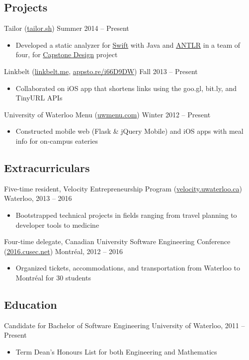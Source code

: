 \documentclass[pdftex,11pt,letterpaper]{article}
\begin{document}
\subsection*{Projects}

Tailor (\href{https://tailor.sh}{tailor.sh}) \hfill {\color{gray} Summer 2014 -- Present}
\begin{itemize}
    \item Developed a static analyzer for \href{https://developer.apple.com/swift/}{Swift} with Java and \href{http://www.antlr.org}{ANTLR} in a team of four, for \href{https://uwaterloo.ca/engineering/entrepreneurship/capstone-design/}{Capstone Design} project
\end{itemize}

Linkbelt (\href{http://linkbelt.me}{linkbelt.me}, \href{http://appsto.re/i66D9DW}{appsto.re/i66D9DW}) \hfill {\color{gray} Fall 2013 -- Present}
\begin{itemize}
  \item Collaborated on iOS app that shortens links using the goo.gl, bit.ly, and TinyURL APIs
\end{itemize}

University of Waterloo Menu (\href{http://uwmenu.com}{uwmenu.com}) \hfill {\color{gray} Winter 2012 -- Present}
\begin{itemize}
  \item Constructed mobile web (Flask \& jQuery Mobile) and iOS apps with meal info for on-campus eateries
\end{itemize}

\subsection*{Extracurriculars}

Five-time resident, Velocity Entrepreneurship Program (\href{http://velocity.uwaterloo.ca}{velocity.uwaterloo.ca}) \hfill {\color{gray} Waterloo, 2013 -- 2016}
\begin{itemize}
  \item Bootstrapped technical projects in fields ranging from travel planning to developer tools to medicine
\end{itemize}

Four-time delegate, Canadian University Software Engineering Conference (\href{http://2016.cusec.net}{2016.cusec.net}) \hfill {\color{gray} Montr\'{e}al, 2012 -- 2016}
\begin{itemize}
  \item Organized tickets, accommodations, and transportation from Waterloo to Montr\'{e}al for 30 students
\end{itemize}

\subsection*{Education}

Candidate for Bachelor of Software Engineering \hfill {\color{gray} University of Waterloo, 2011 -- Present}
\begin{itemize}
  \item Term Dean's Honours List for both Engineering and Mathematics
\end{itemize}
\end{document}

